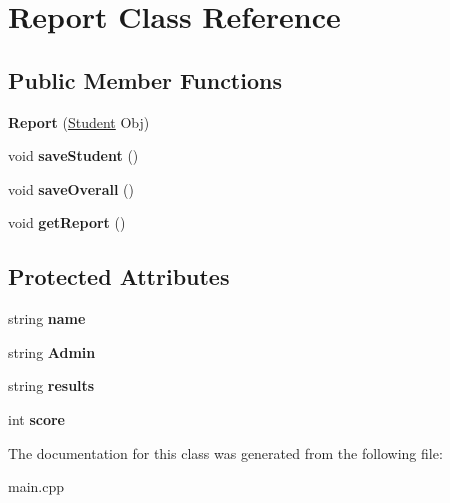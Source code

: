 \hypertarget{class_report}{}\section{Report Class Reference}
\label{class_report}
\subsection*{Public Member Functions}
\begin{DoxyCompactItemize}
\item 
\hypertarget{class_report_a1a0c7cf2cdd726c657af6106e93ce4cd}{}{\bfseries Report} (\hyperlink{class_student}{Student} Obj)\label{class_report_a1a0c7cf2cdd726c657af6106e93ce4cd}

\item 
\hypertarget{class_report_ad4b16bd41eec7ed3c75fe9ead186ba83}{}void {\bfseries save\+Student} ()\label{class_report_ad4b16bd41eec7ed3c75fe9ead186ba83}

\item 
\hypertarget{class_report_a50d349e8ae2d57ffcfe8f9825df8400b}{}void {\bfseries save\+Overall} ()\label{class_report_a50d349e8ae2d57ffcfe8f9825df8400b}

\item 
\hypertarget{class_report_ada1eba8faf50f994d619c8fd244a12bb}{}void {\bfseries get\+Report} ()\label{class_report_ada1eba8faf50f994d619c8fd244a12bb}

\end{DoxyCompactItemize}
\subsection*{Protected Attributes}
\begin{DoxyCompactItemize}
\item 
\hypertarget{class_report_a03f4fa9adf0be066f70bb50cc39b50b2}{}string {\bfseries name}\label{class_report_a03f4fa9adf0be066f70bb50cc39b50b2}

\item 
\hypertarget{class_report_a118ab83e9d0176aebacf83a1c046e259}{}string {\bfseries Admin}\label{class_report_a118ab83e9d0176aebacf83a1c046e259}

\item 
\hypertarget{class_report_a5d5e72ea093be8e3dd73f693c2dd720b}{}string {\bfseries results}\label{class_report_a5d5e72ea093be8e3dd73f693c2dd720b}

\item 
\hypertarget{class_report_ae4a2b8713d0d492d4a14fa2bb25cca77}{}int {\bfseries score}\label{class_report_ae4a2b8713d0d492d4a14fa2bb25cca77}

\end{DoxyCompactItemize}


The documentation for this class was generated from the following file\+:\begin{DoxyCompactItemize}
\item 
main.\+cpp\end{DoxyCompactItemize}
